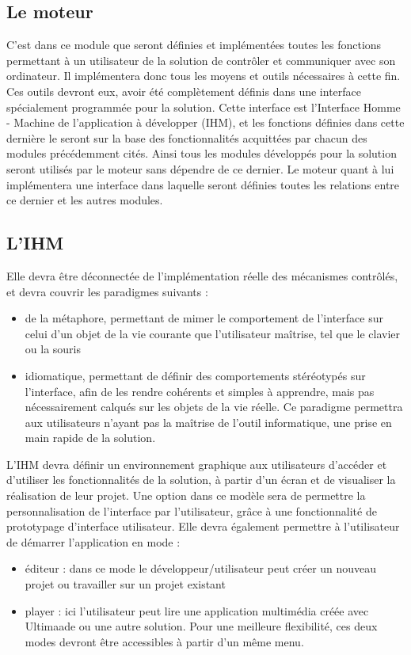 \documentclass{ultimaade-fr}
\begin{document}
\subsection{Le moteur}
C’est dans ce module que seront définies et implémentées toutes les fonctions permettant à un utilisateur de la solution de contrôler et communiquer avec son ordinateur.
Il implémentera donc tous les moyens et  outils nécessaires à cette fin. Ces outils devront
eux, avoir été complètement définis dans une interface spécialement programmée pour la solution.
Cette interface est l’Interface Homme - Machine de l’application à développer (IHM), et les fonctions définies dans cette dernière le seront sur la base des fonctionnalités acquittées
par chacun des modules précédemment cités.
Ainsi tous les  modules développés pour la solution seront utilisés par le  moteur sans dépendre de ce  dernier. Le moteur quant à lui implémentera une interface dans laquelle seront définies toutes les relations entre ce dernier et les autres modules.


\subsection{L’IHM}
Elle devra être déconnectée de l’implémentation réelle des mécanismes contrôlés, et devra couvrir les paradigmes suivants :
\begin{itemize}
\item    de la métaphore, permettant de mimer le comportement de l’interface sur celui d’un
  objet de la vie courante que l’utilisateur maîtrise, tel que le clavier ou la souris
\item idiomatique, permettant de définir des comportements stéréotypés sur l’interface, afin de les rendre cohérents et simples à apprendre, mais pas nécessairement
  calqués sur les objets de la vie réelle.
  Ce paradigme permettra aux utilisateurs n’ayant pas la maîtrise de l’outil informatique, une prise en main rapide de la solution.
\end{itemize}

L’IHM devra définir un environnement graphique aux utilisateurs d’accéder et d’utiliser les fonctionnalités  de  la solution, à partir d’un écran et de visualiser la réalisation de leur projet.
Une option dans ce modèle sera de permettre la personnalisation de l’interface par
l’utilisateur, grâce à une fonctionnalité de prototypage d’interface utilisateur.
Elle devra également permettre à l’utilisateur de démarrer l’application en mode :
\begin{itemize}
\item    éditeur : dans ce mode le développeur/utilisateur peut créer un nouveau projet ou travailler sur un projet existant
\item   player : ici l’utilisateur peut lire une application multimédia créée avec Ultimaade ou une autre solution.
  Pour une meilleure flexibilité, ces deux modes devront être accessibles à partir d’un même menu.
\end{itemize}
\end{document}
